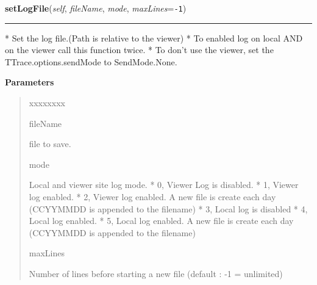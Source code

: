     \label{tracetool:WinTrace:setLogFile}

    \vspace{0.5ex}

\hspace{.8\funcindent}\begin{boxedminipage}{\funcwidth}

    \raggedright \textbf{setLogFile}(\textit{self}, \textit{fileName}, \textit{mode}, \textit{maxLines}={\tt -1})

    \vspace{-1.5ex}

    \rule{\textwidth}{0.5\fboxrule}
\setlength{\parskip}{2ex}
    * Set the log file.(Path is relative to the viewer) * To enabled log on
    local AND on the viewer call this function twice. * To don't use the 
    viewer, set the TTrace.options.sendMode to SendMode.None.

\setlength{\parskip}{1ex}
      \textbf{Parameters}
      \vspace{-1ex}

      \begin{quote}
        \begin{Ventry}{xxxxxxxx}

          \item[fileName]

          file to save.

          \item[mode]

          Local and viewer site log mode. *  0, Viewer Log is disabled. *  
          1, Viewer log enabled. *  2, Viewer log enabled. A new file is 
          create each day (CCYYMMDD is appended to the filename) *  3, 
          Local log is disabled *  4, Local log enabled. *  5, Local log 
          enabled. A new file is create each day (CCYYMMDD is appended to 
          the filename)

          \item[maxLines]

          Number of lines before starting a new file (default : -1 = 
          unlimited)

        \end{Ventry}

      \end{quote}

    \end{boxedminipage}

